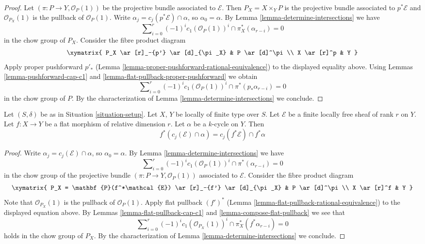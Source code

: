 \begin{proof}
Let $(\pi : P \to Y, \mathcal{O}_P(1))$ be the projective bundle associated
to $\mathcal{E}$. Then $P_X = X \times_Y P$ is the projective bundle associated
to $p^*\mathcal{E}$ and $\mathcal{O}_{P_X}(1)$ is the pullback of
$\mathcal{O}_P(1)$. Write $\alpha_j = c_j(p^*\mathcal{E}) \cap \alpha$, so
$\alpha_0 = \alpha$. By Lemma \ref{lemma-determine-intersections} we have
$$
\sum\nolimits_{i = 0}^r
(-1)^i c_1(\mathcal{O}_P(1))^i \cap
\pi_X^*(\alpha_{r - i}) = 0
$$
in the chow group of $P_X$. Consider the fibre product diagram
$$
\xymatrix{
P_X \ar[r]_-{p'} \ar[d]_{\pi_X} & P \ar[d]^\pi \\
X \ar[r]^p & Y
}
$$
Apply proper pushforward $p'_*$
(Lemma \ref{lemma-proper-pushforward-rational-equivalence})
to the displayed equality above. Using
Lemmas \ref{lemma-pushforward-cap-c1} and
\ref{lemma-flat-pullback-proper-pushforward} we obtain
$$
\sum\nolimits_{i = 0}^r
(-1)^i c_1(\mathcal{O}_P(1))^i \cap
\pi^*(p_*\alpha_{r - i}) = 0
$$
in the chow group of $P$. By the characterization of
Lemma \ref{lemma-determine-intersections} we conclude.
\end{proof}

\begin{lemma}
\label{lemma-flat-pullback-cap-cj}
Let $(S, \delta)$ be as in Situation \ref{situation-setup}.
Let $X$, $Y$ be locally of finite type over $S$.
Let $\mathcal{E}$ be a finite locally free sheaf of rank $r$ on $Y$.
Let $f : X \to Y$ be a flat morphism of relative dimension $r$.
Let $\alpha$ be a $k$-cycle on $Y$.
Then
$$
f^*(c_j(\mathcal{E}) \cap \alpha) = c_j(f^*\mathcal{E}) \cap f^*\alpha
$$
\end{lemma}

\begin{proof}
Write $\alpha_j = c_j(\mathcal{E}) \cap \alpha$, so $\alpha_0 = \alpha$.
By Lemma \ref{lemma-determine-intersections} we have
$$
\sum\nolimits_{i = 0}^r
(-1)^i c_1(\mathcal{O}_P(1))^i \cap
\pi^*(\alpha_{r - i}) = 0
$$
in the chow group of the projective bundle
$(\pi : P \to Y, \mathcal{O}_P(1))$
associated to $\mathcal{E}$. Consider the fibre product diagram
$$
\xymatrix{
P_X = \mathbf{P}(f^*\mathcal{E}) \ar[r]_-{f'} \ar[d]_{\pi_X} &
P \ar[d]^\pi \\
X \ar[r]^f & Y
}
$$
Note that $\mathcal{O}_{P_X}(1)$ is the pullback of $\mathcal{O}_P(1)$.
Apply flat pullback $(f')^*$
(Lemma \ref{lemma-flat-pullback-rational-equivalence}) to the displayed
equation above. By Lemmas \ref{lemma-flat-pullback-cap-c1} and
\ref{lemma-compose-flat-pullback} we see that
$$
\sum\nolimits_{i = 0}^r
(-1)^i c_1(\mathcal{O}_{P_X}(1))^i \cap
\pi_X^*(f^*\alpha_{r - i}) = 0
$$
holds in the chow group of $P_X$. By the characterization of
Lemma \ref{lemma-determine-intersections} we conclude.
\end{proof}

